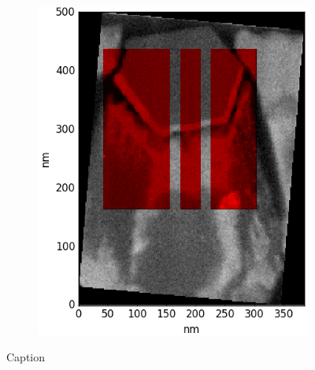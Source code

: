\begin{figure}
\begin{subfigure}{0.33\textwidth}
		\caption{}
		\label{fig:edxspedrot}
	\end{subfigure}%
	\begin{subfigure}{0.33\textwidth}
	\includegraphics[width=\textwidth]{fig/other/edxinsped/show/both1-2}
	\caption{}
	\label{fig:edxspedboth1}
	\end{subfigure}
	\caption{
		\label{fig:edxsped}%
		Caption}
\end{figure}



